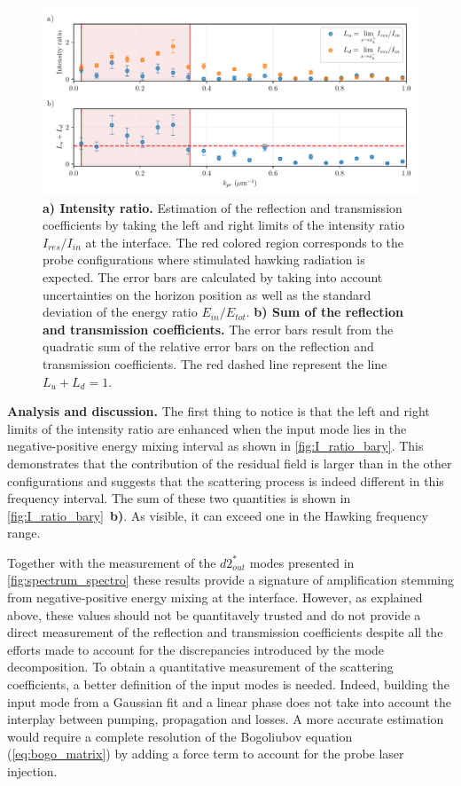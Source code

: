 \begin{figure}
    \centering
    \includegraphics[width=1\textwidth]{chap_stimulated_hawking/fig/I_ratio_bary.pdf}
    \caption{\textbf{a) Intensity ratio.} Estimation of the reflection and transmission coefficients by taking the left and right limits of the intensity ratio $I_{res}/I_{in}$ at the interface. 
    The red colored region corresponds to the probe configurations where stimulated hawking radiation is expected. The error bars are calculated by taking into account uncertainties on the horizon position as well as the standard deviation of the energy ratio $E_{in}/E_{tot}$.
    \textbf{b) Sum of the reflection and transmission coefficients.} The error bars result from the quadratic sum of the relative error bars on the reflection and transmission coefficients. The red dashed line represent the line $L_u+L_d=1$.}
    \label{fig:I_ratio_bary}
\end{figure}

\bigskip

\textbf{Analysis and discussion.} The first thing to notice is that the left and right limits of the intensity ratio are enhanced when the input mode lies in the negative-positive energy mixing interval as shown in \autoref{fig:I_ratio_bary}. This demonstrates that the contribution of the residual field is larger than in the other configurations and suggests that the scattering process is indeed different in this frequency interval. The sum of these two quantities is shown in \autoref{fig:I_ratio_bary}~\textbf{b)}. As visible,
it can exceed one in the Hawking frequency range.

Together with the measurement of the $d2^*_{out}$ modes presented in \autoref{fig:spectrum_spectro} these results provide a signature of amplification stemming from negative-positive energy mixing at the interface. However, as explained above, these values should not be quantitavely trusted and do not provide a direct measurement of the reflection and transmission coefficients despite all the efforts made to account for the discrepancies introduced by the mode decomposition.
To obtain a quantitative measurement of the scattering coefficients, a better definition of the input modes is needed. Indeed, building the input mode from a Gaussian fit and a linear phase does not take into account the interplay between pumping, propagation and losses. A more accurate estimation would require a complete resolution of the Bogoliubov equation (\ref{eq:bogo_matrix}) by adding a force term to account for the probe laser injection. 

